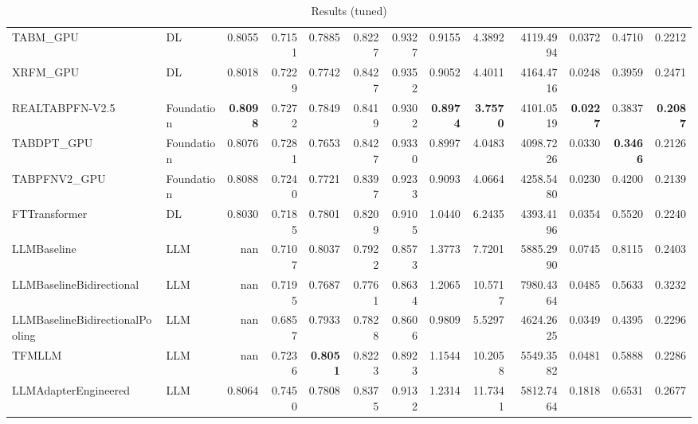 \begin{table}[htbp]
{\begin{tabular}{ll|rrrrrrrrrrr}
TABM\_GPU & DL & 0.8055 & 0.7151 & 0.7885 & 0.8227 & 0.9327 & 0.9155 & 4.3892 & 4119.4994 & 0.0372 & 0.4710 & 0.2212 \\
XRFM\_GPU & DL & 0.8018 & 0.7229 & 0.7742 & 0.8427 & 0.9352 & 0.9052 & 4.4011 & 4164.4716 & 0.0248 & 0.3959 & 0.2471 \\
REALTABPFN-V2.5 & Foundation & \textbf{0.8098} & 0.7272 & 0.7849 & 0.8419 & 0.9302 & \textbf{0.8974} & \textbf{3.7570} & 4101.0519 & \textbf{0.0227} & 0.3837 & \textbf{0.2087} \\
TABDPT\_GPU & Foundation & 0.8076 & 0.7281 & 0.7653 & 0.8427 & 0.9330 & 0.8997 & 4.0483 & 4098.7226 & 0.0330 & \textbf{0.3466} & 0.2126 \\
TABPFNV2\_GPU & Foundation & 0.8088 & 0.7240 & 0.7721 & 0.8397 & 0.9233 & 0.9093 & 4.0664 & 4258.5480 & 0.0230 & 0.4200 & 0.2139 \\
\midrule
FTTransformer & DL & 0.8030 & 0.7185 & 0.7801 & 0.8209 & 0.9105 & 1.0440 & 6.2435 & 4393.4196 & 0.0354 & 0.5520 & 0.2240 \\
LLMBaseline & LLM & nan & 0.7107 & 0.8037 & 0.7922 & 0.8573 & 1.3773 & 7.7201 & 5885.2990 & 0.0745 & 0.8115 & 0.2403 \\
LLMBaselineBidirectional & LLM & nan & 0.7195 & 0.7687 & 0.7761 & 0.8634 & 1.2065 & 10.5717 & 7980.4364 & 0.0485 & 0.5633 & 0.3232 \\
LLMBaselineBidirectionalPooling & LLM & nan & 0.6857 & 0.7933 & 0.7828 & 0.8606 & 0.9809 & 5.5297 & 4624.2625 & 0.0349 & 0.4395 & 0.2296 \\
TFMLLM & LLM & nan & 0.7236 & \textbf{0.8051} & 0.8223 & 0.8923 & 1.1544 & 10.2058 & 5549.3582 & 0.0481 & 0.5888 & 0.2286 \\
LLMAdapterEngineered & LLM & 0.8064 & 0.7450 & 0.7808 & 0.8375 & 0.9132 & 1.2314 & 11.7341 & 5812.7464 & 0.1818 & 0.6531 & 0.2677 \\
\bottomrule
\end{tabular}
}
\caption{Results (tuned)}
\label{tab:results_tuned}
\end{table}